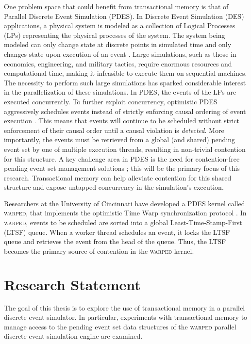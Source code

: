 \documentclass[11pt]{book}
\begin{document}
One problem space that could benefit from transactional memory is that of Parallel
Discrete Event Simulation (PDES).  In Discrete Event Simulation (DES) applications, a
physical system is modeled as a collection of Logical Processes (LPs) representing the
physical processes of the system.  The system being modeled can only change state at
discrete points in simulated time and only changes state upon execution of an event
\cite{fujimoto}.  Large simulations, such as those in economics, engineering, and military
tactics, require enormous resources and computational time, making it infeasible to
execute them on sequential machines.  The necessity to perform such large simulations has
sparked considerable interest in the parallelization of these simulations.  In PDES, the
events of the LPs are executed concurrently.  To further exploit concurrency, optimistic
PDES aggressively schedules events instead of strictly enforcing causal ordering of event
execution \cite{fujimoto,dickman_thesis}.  This means that events will continue to be
scheduled without strict enforcement of their causal order until a causal violation is
\emph{detected}.  More importantly, the events must be retrieved from a global (and
shared) pending event set by one of multiple execution threads, resulting in non-trivial
contention for this structure.  A key challenge area in PDES is the need for
contention-free pending event set management solutions \cite{dickman}; this will be the
primary focus of this research.  Transactional memory can help alleviate contention for
this shared structure and expose untapped concurrency in the simulation's execution.

Researchers at the University of Cincinnati have developed a PDES kernel called
\textsc{warped}, that implements the optimistic Time Warp synchronization protocol
\cite{jefferson-85,fujimoto}.  In \textsc{warped}, events to be scheduled are sorted into
a global Least-Time-Stamp-First (LTSF) queue.  When a worker thread schedules an event, it
locks the LTSF queue and retrieves the event from the head of the queue.  Thus, the LTSF
becomes the primary source of contention in the \textsc{warped} kernel.

\section{Research Statement}

The goal of this thesis is to explore the use of transactional memory in a parallel
discrete event simulator.  In particular, experiments with transactional memory to manage
access to the pending event set data structures of the \textsc{warped} parallel discrete
event simulation engine are examined.
\end{document}
